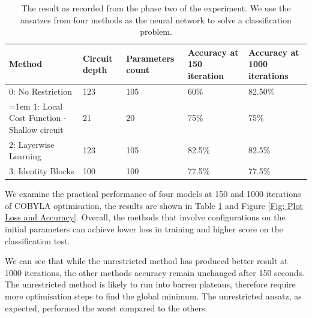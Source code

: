 \begin{table}
    \centering
    \begin{tabular}{|| p{4cm} p{2cm} p{2cm} p{2cm} p{2cm} ||}
        \hline
        \textbf{Method}                          & \textbf{Circuit depth} & \textbf{Parameters count} & \textbf{Accuracy at 150 iteration} & \textbf{Accuracy at 1000 iterations} \\
        \hline \hline
        0: No Restriction                        & 123                    & 105                       & 60\%                               & 82.50\%                              \\
        \raggedright
        \hangindent=1em
        \hangafter=1
        1: Local Cost Function - Shallow circuit & 21                     & 20                        & 75\%                               & 75\%                                 \\
        2: Layerwise Learning                    & 123                    & 105                       & 82.5\%                             & 82.5\%                               \\
        3: Identity Blocks                       & 100                    & 100                       & 77.5\%                             & 77.5\%                               \\
        \hline
    \end{tabular}
    \caption{
        The result as recorded from the phase two of the experiment.
        We use the ansatzes from four methods as the neural network to solve a classification problem.
    }
    \label{Tab: Experiment Phase 2 Res}
\end{table}

We examine the practical performance of four models at 150 and 1000 iterations of COBYLA optimisation, the results are shown in Table \ref{Tab: Experiment Phase 2 Res} and Figure \ref{Fig: Plot Loss and Accuracy}.
Overall, the methods that involve configurations on the initial parameters can achieve lower loss in training and higher score on the classification test.

We can see that while the unrestricted method has produced better result at 1000 iterations, the other methods accuracy remain unchanged after 150 seconds.
The unrestricted method is likely to run into barren plateaus, therefore require more optimisation steps to find the global minimum.
The unrestricted ansatz, as expected, performed the worst compared to the others.

